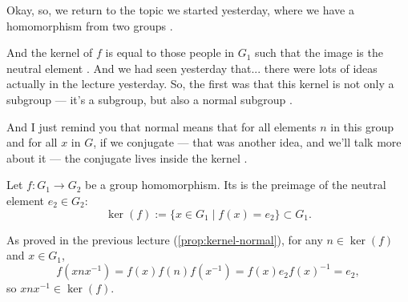 \begin{speech}[00:00:00 - 00:01:18]
Okay, so, we return to the topic we started yesterday, where we have a homomorphism from two groups .

And the kernel of $f$ is equal to those people in $G_1$ such that the image is the neutral element . And we had seen yesterday that... there were lots of ideas actually in the lecture yesterday. So, the first was that this kernel is not only a subgroup --- it's a subgroup, but also a normal subgroup .

And I just remind you that normal means that for all elements $n$ in this group and for all $x$ in $G$, if we conjugate --- that was another idea, and we'll talk more about it --- the conjugate lives inside the kernel .
\end{speech}

\begin{content}

Let $f \colon G_1 \longrightarrow G_2$ be a group homomorphism. Its  is the preimage of the neutral element $e_2 \in G_2$:
\begin{equation}\label{eq:kernel-def-w8wed}
\ker(f) := \{ x \in G_1 \mid f(x) = e_2 \} \subset G_1.
\end{equation}


\begin{steps}
As proved in the previous lecture (\cref{prop:kernel-normal}), for any $n \in \ker(f)$ and $x \in G_1$,
\[
f(x n x^{-1}) = f(x) f(n) f(x^{-1}) = f(x) e_2 f(x)^{-1} = e_2,
\]
so $x n x^{-1} \in \ker(f)$.
\end{steps}
\end{content}

